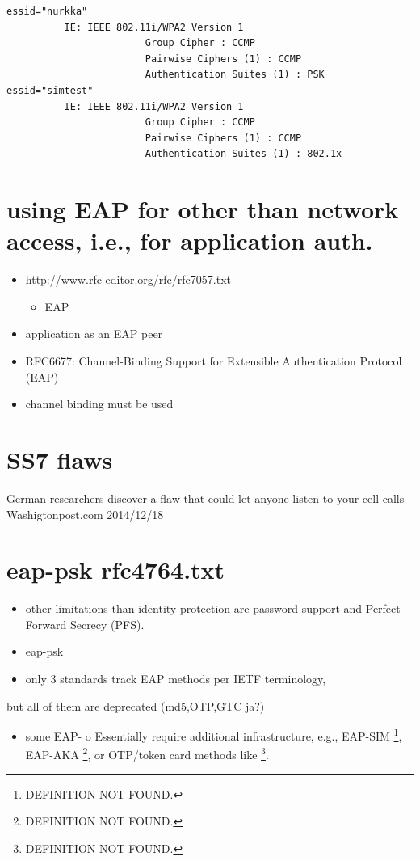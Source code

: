\documentclass[12pt,a4paper,english]{tutthesis}
\begin{document}
\scriptsize
\begin{verbatim}
essid="nurkka"
          IE: IEEE 802.11i/WPA2 Version 1
                        Group Cipher : CCMP
                        Pairwise Ciphers (1) : CCMP
                        Authentication Suites (1) : PSK
essid="simtest"
          IE: IEEE 802.11i/WPA2 Version 1
                        Group Cipher : CCMP
                        Pairwise Ciphers (1) : CCMP
                        Authentication Suites (1) : 802.1x
\end{verbatim}
\normalsize

\section{using EAP for other than network access, i.e., for application auth.}
\label{sec-8-2}
\begin{itemize}
\item \url{http://www.rfc-editor.org/rfc/rfc7057.txt}
\begin{itemize}
\item EAP
\end{itemize}
\item application as an EAP peer
\item RFC6677: Channel-Binding Support for Extensible Authentication Protocol (EAP)
\item channel binding must be used
\end{itemize}

\section{SS7 flaws}
\label{sec-8-3}
German researchers discover a flaw that could let anyone listen to
your cell calls 
Washigtonpost.com 2014/12/18
\section{eap-psk rfc4764.txt}
\label{sec-8-4}
\begin{itemize}
\item other limitations than identity protection are password support and Perfect Forward Secrecy (PFS).
\item eap-psk
\item only 3 standards track EAP methods per IETF terminology,
\end{itemize}
but all of them are deprecated (md5,OTP,GTC ja?)
\begin{itemize}
\item some EAP- o  Essentially require additional infrastructure, e.g., EAP-SIM \footnote{DEFINITION NOT FOUND.},
EAP-AKA \footnote{DEFINITION NOT FOUND.}, or OTP/token card methods like \footnote{DEFINITION NOT FOUND.}.
\end{itemize}
\end{document}
